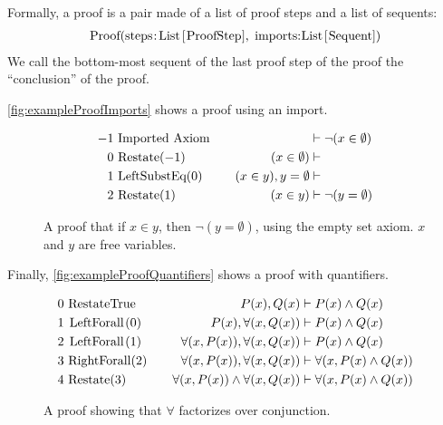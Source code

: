 Formally, a proof is a pair made of a list of proof steps and a list of sequents:
%
\begin{gather*}
    \text{\lstinline|Proof(steps:List[ProofStep], imports:List[Sequent])|}
\end{gather*}
%
We call the bottom-most sequent of the last proof step of the proof the ``conclusion'' of the proof.

\noindent
\autoref{fig:exampleProofImports} shows a proof using an import.
%
\begin{figure}[ht]
  \begin{align*}
    -1 & ~\text{\lstinline|Imported Axiom|} & \quad                         & \vdash \neg (x \in \emptyset) \\
    0  & ~\text{\lstinline|Restate|}(-1)    & \quad  (x \in \emptyset)      & \vdash                        \\
    1  & ~\text{\lstinline|LeftSubstEq|}(0) & \quad  (x \in y), y=\emptyset & \vdash                        \\
    2  & ~\text{\lstinline|Restate|}(1)     & \quad  (x \in y)              & \vdash \neg(y=\emptyset)
  \end{align*}
  \caption{A proof that if $x\in y$, then $\neg (y=\emptyset)$, using the empty set axiom. $x$ and $y$ are free variables.}
  \label{fig:exampleProofImports}
\end{figure}

\noindent
Finally, \autoref{fig:exampleProofQuantifiers} shows a proof with quantifiers.
%
\begin{figure}[ht]
  \begin{align*}
    0 & ~\text{\lstinline|RestateTrue|}    & \quad  P(x), Q(x)                              & \vdash P(x) \land Q(x)             \\
    1 & ~\text{\lstinline|LeftForall|}(0)  & \quad  P(x), \forall(x, Q(x))                  & \vdash P(x) \land Q(x)             \\
    2 & ~\text{\lstinline|LeftForall|}(1)  & \quad  \forall(x, P(x)), \forall(x, Q(x))      & \vdash P(x) \land Q(x)             \\
    3 & ~\text{\lstinline|RightForall|}(2) & \quad  \forall(x, P(x)),  \forall(x, Q(x))     & \vdash \forall(x, P(x) \land Q(x)) \\
    4 & ~\text{\lstinline|Restate|}(3)     & \quad  \forall(x, P(x)) \land \forall(x, Q(x)) & \vdash \forall(x, P(x) \land Q(x))
  \end{align*}
  \caption{A proof showing that $\forall$ factorizes over conjunction.}
  \label{fig:exampleProofQuantifiers}
\end{figure}

